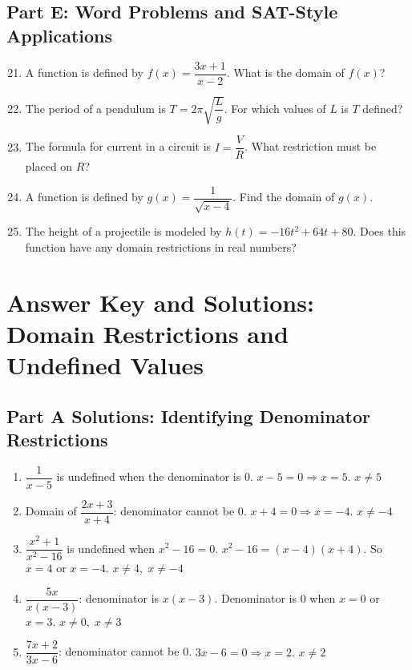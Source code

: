 \documentclass[14pt]{extarticle}
\begin{document}
\subsection*{Part E: Word Problems and SAT-Style Applications}
\begin{enumerate}
  \setcounter{enumi}{20}
  \item A function is defined by \(f(x) = \dfrac{3x + 1}{x - 2}\). What is the domain of \(f(x)\)?
  \item The period of a pendulum is \(T = 2\pi \sqrt{\dfrac{L}{g}}\). For which values of \(L\) is \(T\) defined?
  \item The formula for current in a circuit is \(I = \dfrac{V}{R}\). What restriction must be placed on \(R\)?
  \item A function is defined by \(g(x) = \dfrac{1}{\sqrt{x - 4}}\). Find the domain of \(g(x)\).
  \item The height of a projectile is modeled by \(h(t) = -16t^2 + 64t + 80\). Does this function have any domain restrictions in real numbers?
\end{enumerate}

\newpage


\section*{Answer Key and Solutions: Domain Restrictions and Undefined Values}

\subsection*{Part A Solutions: Identifying Denominator Restrictions}
\begin{enumerate}
  \item \(\dfrac{1}{x - 5}\) is undefined when the denominator is 0.  
  \(x - 5 = 0 \Rightarrow x = 5.\)  
  \(\boxed{x \ne 5}\)

  \item Domain of \(\dfrac{2x + 3}{x + 4}\): denominator cannot be 0.  
  \(x + 4 = 0 \Rightarrow x = -4.\)  
  \(\boxed{x \ne -4}\)

  \item \(\dfrac{x^2 + 1}{x^2 - 16}\) is undefined when \(x^2 - 16 = 0\).  
  \(x^2 - 16 = (x - 4)(x + 4).\)  
  So \(x = 4\) or \(x = -4.\)  
  \(\boxed{x \ne 4,\; x \ne -4}\)

  \item \(\dfrac{5x}{x(x - 3)}\): denominator is \(x(x-3)\).  
  Denominator is 0 when \(x = 0\) or \(x = 3.\)  
  \(\boxed{x \ne 0,\; x \ne 3}\)

  \item \(\dfrac{7x + 2}{3x - 6}\): denominator cannot be 0.  
  \(3x - 6 = 0 \Rightarrow x = 2.\)  
  \(\boxed{x \ne 2}\)
\end{enumerate}
\end{document}
